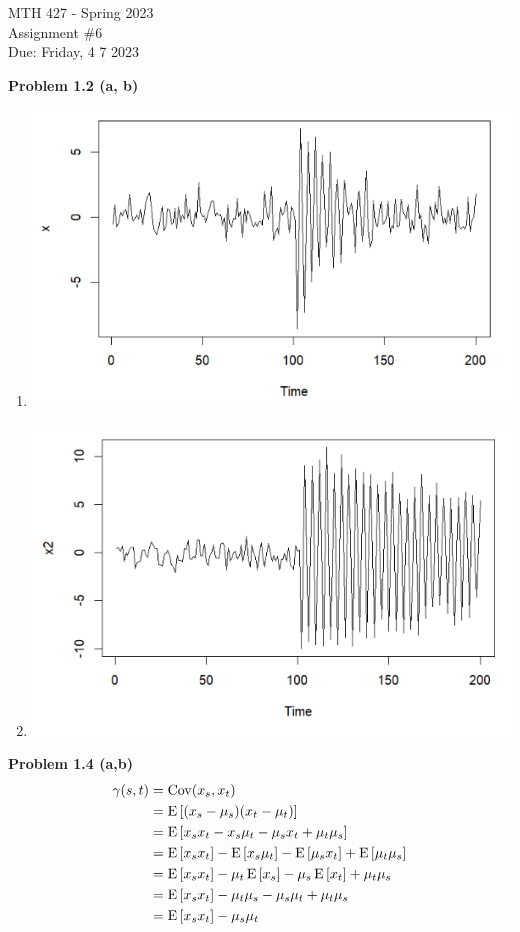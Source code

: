 \documentclass[12pt]{article}
\def\Cov{\operatorname{Cov}} %
\begin{document}
\pagestyle{fancy}
\fancyhf{}

\noindent MTH 427 - Spring 2023
\\Assignment \#6
\\Due: Friday, 4 7 2023

\textbf{Problem 1.2 (a, b)}
\begin{enumerate}[label=(\alph*)]
    \item  \includegraphics[width=6in]{img/a.PNG}
    \item  \includegraphics[width=6in]{img/b.PNG}
\end{enumerate}

\textbf{Problem 1.4 (a,b)}
\begin{align*}
    \gamma(s, t) &= \Cov(x_s, x_t)\\ &= \Eb{(x_s - \mu_s)(x_t - \mu_t)}\\
    &= \Eb{x_s x_t - x_s \mu_t - \mu_s x_t + \mu_t \mu_s}\\
    &= \Eb{x_s x_t} - \Eb{x_s \mu_t} - \Eb{\mu_s x_t} + \Eb{\mu_t \mu_s}\\
    &= \Eb{x_s x_t} -\mu_t \Eb{x_s} - \mu_s \Eb{x_t} + \mu_t \mu_s\\
    &= \Eb{x_s x_t} -\mu_t \mu_s - \mu_s \mu_t + \mu_t \mu_s\\
    &= \Eb{x_s x_t} -\mu_s \mu_t
\end{align*}
\end{document}
